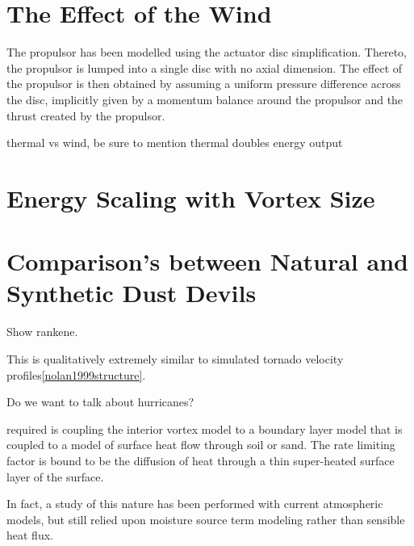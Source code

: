 \section{The Effect of the Wind}
\label{sec:wind_impact}


The   propulsor   has   been   modelled   using the actuator    disc
simplification.  Thereto,    the  propulsor  is  lumped  into  a  single
disc  with  no axial dimension.  The  effect  of  the  propulsor  is
then  obtained  by  assuming  a  uniform  pressure  difference across
the  disc,  implicitly  given by a  momentum  balance  around  the
propulsor and the thrust created  by  the  propulsor.


thermal vs wind, be sure to mention thermal doubles energy output

\section{Energy Scaling with Vortex Size}


\section{Comparison's between Natural and Synthetic Dust Devils}

Show rankene. 

This is qualitatively extremely similar to simulated tornado velocity
profiles\ref{nolan1999structure}. 



Do we want to talk about hurricanes?


 required is coupling the interior vortex model to a
 boundary layer model that is coupled to a model of surface heat flow
 through soil or sand. The rate limiting factor is bound to be the
 diffusion of heat through a thin super-heated surface layer of
 the surface\cite{emm_comm}.   

In fact, a study of this nature has been performed with current
atmospheric models\cite{emanuel2008hypothesis}, but still relied upon
moisture source term modeling rather than sensible heat flux.   